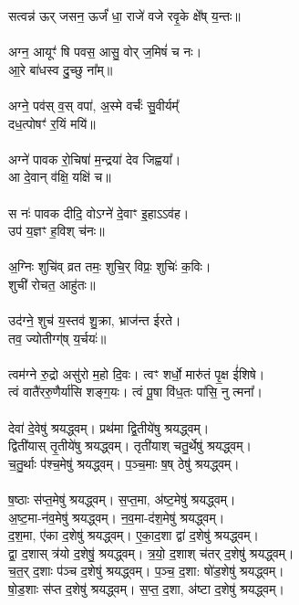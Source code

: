 सत्वन्न॑ ऊर् जसन॒ ऊर्जं॑ धा॒ राजे॑ वजे रवृ॒के क्षे᳚ष् य॒न्तः॥\\
\\
अग्न॒ आयूꣳ॑ षि पवस॒ आसु॒ वोर् ज॒मिषं॑ च नः।\\
आ॒रे बा॑धस्व दु॒च्छु ना᳚म्॥\\
\\
अग्ने॒ पव॑स् व॒स् वपा॑, अ॒स्मे वर्चः॑॑ सु॒वीर्यम्᳚\\
दध॒त्पोषꣳ॑ र॒यिं मयि॑॥\\
\\
अग्ने॑ पावक रो॒चिषा॑ म॒न्द्रया॑ देव जिह्वया᳚।\\
आ दे॒वान् व॑क्षि॒ यक्षि॑ च॥\\
\\
स नः॑ पावक दीदि॒ वोऽग्ने॑ दे॒वाꣳ इ॒हाऽऽव॑ह।\\
उप॑ य॒ज्ञꣳ ह॒विश् च॑नः॥\\
\\
अ॒ग्निः शुचि॑व् व्रत तमः॒ शुचि॒र् विप्रः॒ शुचिः॑ क॒विः।\\
शुची॑ रोचत॒ आहु॑तः॥\\
\\
उद॑ग्ने॒ शुच॑ य॒स्तव॑ शु॒क्रा, भ्राज॑न्त ईरते।\\
तव॒ ज्योतीग्ग्॑ष् य॒र्चयः॑॥\\
\\
त्वम॑ग्ने रु॒द्रो असु॑रो म॒हो दि॒वः। त्वꣳ शर्धो॒ मारु॑तं पृ॒क्ष ई॑शिषे।\\
त्वं वातै॑ररु॒णैर्या॑सि शङ्ग॒यः। त्वं पू॒षा वि॑ध॒तः पा॑सि॒ नु त्मना᳚।\\
\\
देवा॑ दे॒वेषु॑ श्रयद्ध्वम्। प्रथ॑मा द्वि॒तीये॑षु श्रयद्ध्वम्। \\
द्विती॑यास् तृ॒तीये॑षु श्रयद्ध्वम्। तृती॑याश् चतु॒र्थेषु॑ श्रयद्ध्वम्। \\
च॒तु॒र्थाः प॑श्च॒मेषु॑ श्रयद्ध्वम्। प॒ञ्च॒माः ष॒ष् ठेषु॑ श्रयद्ध्वम्।\\
\\
ष॒ष्ठाः स॑प्त॒मेषु॑ श्रयद्ध्वम्। स॒प्त॒मा, अ॑ष्ट॒मेषु॑ श्रयद्ध्वम्। \\
अ॒ष्ट॒मा-न॑व॒मेषु॑ श्रयद्ध्वम्। न॒व॒मा-द॑श॒मेषु॑ श्रयद्ध्वम्। \\
द॒श॒मा, ए॑का द॒शेषु॑ श्रयद्ध्वम्। ए॒का॒द॒शा द्वा॑ द॒शेषु॑ श्रयद्ध्वम्। \\
द्वा॒ द॒शास् त्र॑यो द॒शेषु॒॑ श्रयद्ध्वम्। त्र॒यो॒ द॒शाश् च॑तर् द॒शेषु॑ श्रयद्ध्वम्। \\
च॒त॒र् द॒शाः प॑ञ्च द॒शेषु॑ श्रयद्ध्वम्। प॒ञ्च॒ द॒शा: षो॑ड॒शेषु॑ श्रयद्ध्वम्। \\
षो॒ड॒शाः स॑प्त द॒शेषु॑ श्रयद्ध्वम्। स॒प्त॒ द॒शा, अ॑ष्टा द॒शेषु॑ श्रयद्ध्वम्।\\
